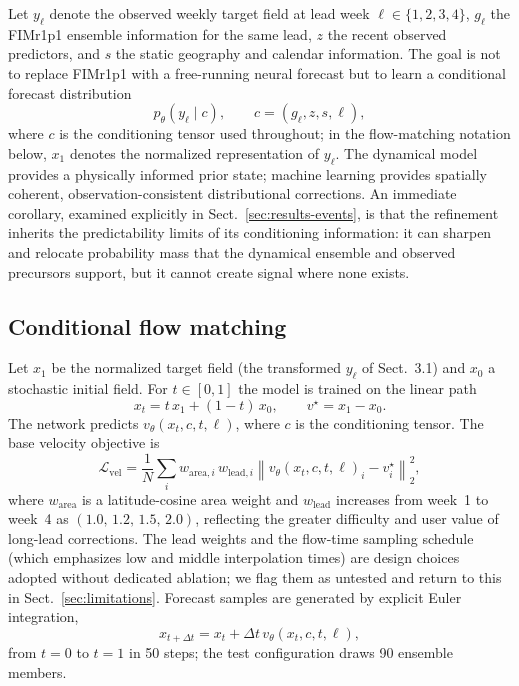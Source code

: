\documentclass[11pt]{article}
\newcommand{\modelshort}{FIMr1p1}
\begin{document}
Let $y_{\ell}$ denote the observed weekly target field at lead week $\ell\in\{1,2,3,4\}$, $g_{\ell}$ the \modelshort{} ensemble information for the same lead, $z$ the recent observed predictors, and $s$ the static geography and calendar information. The goal is not to replace \modelshort{} with a free-running neural forecast but to learn a conditional forecast distribution
\begin{equation}
  p_{\theta}(y_{\ell}\mid c), \qquad c = (g_{\ell}, z, s, \ell),
\end{equation}
where $c$ is the conditioning tensor used throughout; in the flow-matching notation below, $x_1$ denotes the normalized representation of $y_{\ell}$. The dynamical model provides a physically informed prior state; machine learning provides spatially coherent, observation-consistent distributional corrections. An immediate corollary, examined explicitly in Sect.~\ref{sec:results-events}, is that the refinement inherits the predictability limits of its conditioning information: it can sharpen and relocate probability mass that the dynamical ensemble and observed precursors support, but it cannot create signal where none exists.

\subsection{Conditional flow matching}

Let $x_1$ be the normalized target field (the transformed $y_\ell$ of Sect.~3.1) and $x_0$ a stochastic initial field. For $t\in[0,1]$ the model is trained on the linear path
\begin{equation}
  x_t = t\,x_1 + (1-t)\,x_0,
\qquad
  v^\star = x_1 - x_0 .
\end{equation}
The network predicts $v_{\theta}(x_t,c,t,\ell)$, where $c$ is the conditioning tensor. The base velocity objective is
\begin{equation}
  \mathcal{L}_{\mathrm{vel}} =
  \frac{1}{N}\sum_i w_{\mathrm{area},i}\, w_{\mathrm{lead},i}
  \left\lVert v_{\theta}(x_t,c,t,\ell)_i - v^\star_i \right\rVert_2^2,
\end{equation}
where $w_{\mathrm{area}}$ is a latitude-cosine area weight and $w_{\mathrm{lead}}$ increases from week~1 to week~4 as $(1.0,\,1.2,\,1.5,\,2.0)$, reflecting the greater difficulty and user value of long-lead corrections. The lead weights and the flow-time sampling schedule (which emphasizes low and middle interpolation times) are design choices adopted without dedicated ablation; we flag them as untested and return to this in Sect.~\ref{sec:limitations}. Forecast samples are generated by explicit Euler integration,
\begin{equation}
  x_{t+\Delta t} = x_t + \Delta t\, v_{\theta}(x_t,c,t,\ell),
\end{equation}
from $t=0$ to $t=1$ in 50 steps; the test configuration draws 90 ensemble members.
\end{document}
